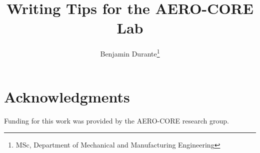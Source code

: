 \documentclass[journal]{new-aiaa} %
\title{Writing Tips for the AERO-CORE Lab} %
\author{
	Benjamin Durante\footnote{MSc, Department of Mechanical and Manufacturing Engineering}
}
\affil{University of Calgary, Calgary, Alberta, Canada, T2N 4V8}
\begin{document}

	\maketitle
	
	
	
	


	\section*{Acknowledgments}
	Funding for this work was provided by the AERO-CORE research group. 

	
\end{document}
